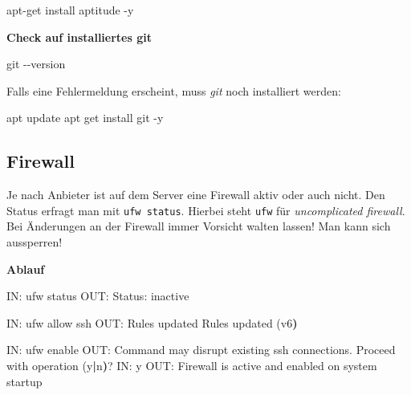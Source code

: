 \documentclass[
  letterpaper,
  DIV=11]{scrreprt}
\newenvironment{Shaded}{\begin{snugshade}}{\end{snugshade}}
\newcommand{\AttributeTok}[1]{\textcolor[rgb]{0.40,0.45,0.13}{#1}}
\newcommand{\ErrorTok}[1]{\textcolor[rgb]{0.68,0.00,0.00}{#1}}
\newcommand{\ExtensionTok}[1]{\textcolor[rgb]{0.00,0.23,0.31}{#1}}
\newcommand{\FunctionTok}[1]{\textcolor[rgb]{0.28,0.35,0.67}{#1}}
\newcommand{\KeywordTok}[1]{\textcolor[rgb]{0.00,0.23,0.31}{\textbf{#1}}}
\newcommand{\NormalTok}[1]{\textcolor[rgb]{0.00,0.23,0.31}{#1}}
\newcommand{\git}{\textit{git}\xspace}
\begin{document}
\begin{Shaded}
\begin{Highlighting}[]
\ExtensionTok{apt{-}get}\NormalTok{ install aptitude }\AttributeTok{{-}y}
\end{Highlighting}
\end{Shaded}

\textbf{Check auf installiertes git}

\begin{Shaded}
\begin{Highlighting}[]
\FunctionTok{git} \AttributeTok{{-}{-}version}
\end{Highlighting}
\end{Shaded}

Falls eine Fehlermeldung erscheint, muss \git noch installiert werden:

\begin{Shaded}
\begin{Highlighting}[]
\ExtensionTok{apt}\NormalTok{ update }
\ExtensionTok{apt}\NormalTok{ get install git }\AttributeTok{{-}y}
\end{Highlighting}
\end{Shaded}

\subsection{Firewall}\label{firewall}

Je nach Anbieter ist auf dem Server eine Firewall aktiv oder auch nicht.
Den Status erfragt man mit \texttt{ufw\ status}. Hierbei steht
\texttt{ufw} für \emph{uncomplicated firewall}. Bei Änderungen an der
Firewall immer Vorsicht walten lassen! Man kann sich aussperren!

\textbf{Ablauf}

\begin{Shaded}
\begin{Highlighting}[]
\ExtensionTok{IN:}\NormalTok{   ufw status}
\ExtensionTok{OUT:}\NormalTok{  Status: inactive}

\ExtensionTok{IN:}\NormalTok{   ufw allow ssh }
\ExtensionTok{OUT:}\NormalTok{  Rules updated}
      \ExtensionTok{Rules}\NormalTok{ updated }\ErrorTok{(}\ExtensionTok{v6}\KeywordTok{)}

\ExtensionTok{IN:}\NormalTok{   ufw enable}
\ExtensionTok{OUT:}\NormalTok{  Command may disrupt existing ssh connections. }
      \ExtensionTok{Proceed}\NormalTok{ with operation }\ErrorTok{(}\ExtensionTok{y}\KeywordTok{|}\ExtensionTok{n}\KeywordTok{)}\ExtensionTok{?}
\ExtensionTok{IN:}\NormalTok{   y}
\ExtensionTok{OUT:}\NormalTok{  Firewall is active and enabled on system startup}
\end{Highlighting}
\end{Shaded}
\end{document}
